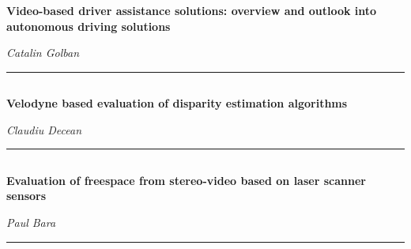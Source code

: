 	    {\bf Video-based driver assistance solutions: overview and outlook into autonomous driving solutions} \nopagebreak

	    {\it Catalin Golban} \nopagebreak
            \\ 
	    \noindent\rule{\textwidth}{0.4pt}

        
\vspace*{-36pt}\subsection[ 
    	   {\bf Velodyne based evaluation of disparity estimation algorithms
           } \\
           {\it Claudiu Decean
           }
	]
	    {
            }

	    {\bf Velodyne based evaluation of disparity estimation algorithms} \nopagebreak

	    {\it Claudiu Decean} \nopagebreak
	    \\
	    \noindent\rule{\textwidth}{0.4pt}
            
\vspace*{-36pt}\subsection[ 
    	   {\bf Evaluation of freespace from stereo-video based on laser scanner sensors
           } \\
           {\it Paul Bara
           }
	]
	    {
            }

	    {\bf Evaluation of freespace from stereo-video based on laser scanner sensors} \nopagebreak

	    {\it Paul Bara} \nopagebreak
	    \\
	    \noindent\rule{\textwidth}{0.4pt}

\vspace*{-36pt}\subsection[ 
    	   {\bf Height obstructions estimation from disparity and image gradients
           } \\
           {\it Doru Nitu
           }
	]
	    {
            }


